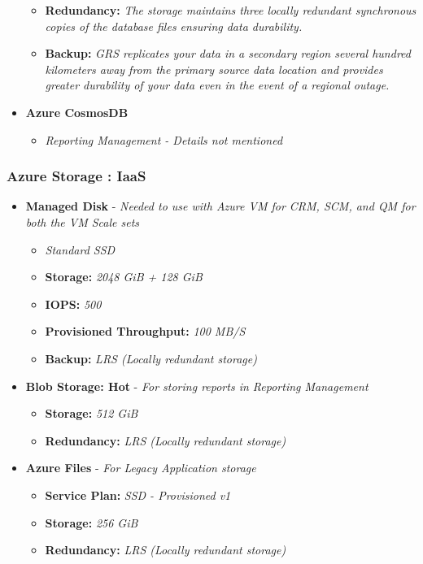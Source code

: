 \documentclass{llncs}
\begin{document}
\begin{itemize}
\begin{itemize}
              \item  \textbf{Redundancy:} \textit{The storage maintains three locally redundant synchronous copies of the database files ensuring data durability.}
              \item  \textbf{Backup:} \textit{GRS replicates your data in a secondary region several hundred kilometers away from the primary source data location and provides greater durability of your data even in the event of a regional outage.}
          \end{itemize}
    \item \textbf{Azure CosmosDB}
          \begin{itemize}
              \item \textit{Reporting Management - Details not mentioned}

          \end{itemize}
\end{itemize}

\subsubsection{Azure Storage : IaaS} \leavevmode\newline
\begin{itemize}
    \item \textbf{Managed Disk} - \textit{Needed to use with Azure VM for CRM, SCM, and QM for both the VM Scale sets}
          \begin{itemize}
              \item \textit{Standard SSD}
              \item  \textbf{Storage:} \textit{2048 GiB + 128 GiB}
              \item  \textbf{IOPS:} \textit{500}
              \item  \textbf{Provisioned Throughput:} \textit{100 MB/S}
              \item  \textbf{Backup:} \textit{LRS (Locally redundant storage)}
          \end{itemize}
    \item \textbf{Blob Storage: Hot} - \textit{For storing reports in Reporting Management}
          \begin{itemize}
              \item  \textbf{Storage:} \textit{512 GiB}
              \item  \textbf{Redundancy:} \textit{LRS (Locally redundant storage)}
          \end{itemize}
    \item \textbf{Azure Files} - \textit{For Legacy Application storage}
          \begin{itemize}
              \item  \textbf{Service Plan:} \textit{SSD - Provisioned v1}
              \item  \textbf{Storage:} \textit{256 GiB}
              \item  \textbf{Redundancy:} \textit{LRS (Locally redundant storage)}
          \end{itemize}
\end{itemize}
\end{document}
